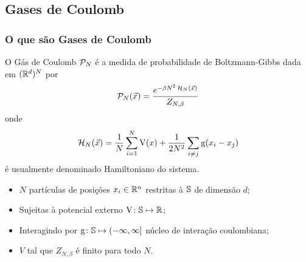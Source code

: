 \subsection{Gases de Coulomb}
\begin{frame}
	\frametitle{O que são Gases de Coulomb}
	O Gás de Coulomb $\mathcal{P}_N$ é a medida de probabilidade de Boltzmann-Gibbs dada em $(\mathbb{R}^d)^N$ por
	\[
		\mathcal{P}_N(\vec{x}) = \frac{e^{-\beta N^2 \operatorname{\mathcal{H}}_N(\vec{x})}}{Z_{N,\beta}}
	\] 
	onde 
	\[
		\operatorname{\mathcal{H}}_N(\vec{x}) = \frac{1}{N} \sum_{i = 1}^{N} \operatorname{V}(x) + \frac{1}{2N^2} \sum_{i \neq j} \operatorname{g}(x_i - x_j)
	\]
	é usualmente denominado Hamiltoniano do sistema. \cite{ChafaCoulombMeasure}
\end{frame}
\begin{frame}
	\begin{itemize}
	\item $N$ partículas de posições $x_i \in \mathbb{R}^n$ restritas à $\mathbb{S}$ de dimensão $d$;
	\pause
	\item Sujeitas à potencial externo $\operatorname{V} \colon \mathbb{S} \mapsto \mathbb{R}$;
	\pause
	\item Interagindo por $\operatorname{g} \colon \mathbb{S} \mapsto (-\infty, \infty]$ núcleo de interação coulombiana;
	\pause
	\item $V$ tal que  $Z_{N, \beta}$ é finito para todo $N$.
	\end{itemize}
\end{frame}



